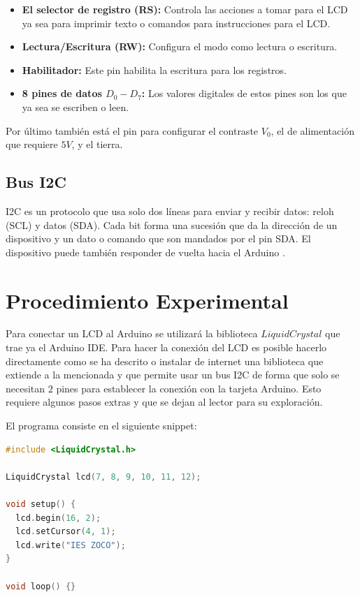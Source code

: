 \documentclass{article}
\begin{document}
    \begin{itemize}
        \item \textbf{El selector de registro (RS):} Controla las acciones a
        tomar para el LCD ya sea para imprimir texto o comandos para
        instrucciones para el LCD.
        \item \textbf{Lectura/Escritura (RW):} Configura el modo como lectura
        o escritura.
        \item \textbf{Habilitador:} Este pin habilita la escritura para los
        registros.
        \item \textbf{8 pines de datos $D_0-D_7$:} Los valores digitales de
        estos pines son los que ya sea se escriben o leen.
    \end{itemize}

    Por último también está el pin para configurar el contraste $V_0$, el de
    alimentación que requiere $5V$, y el tierra.

    \subsection{Bus I2C}

    I2C es un protocolo que usa solo dos líneas para enviar y recibir datos:
    reloh (SCL) y datos (SDA). Cada bit forma una sucesión que da la
    dirección de un dispositivo y un dato o comando que son mandados por el
    pin SDA. El dispositivo puede también responder de vuelta hacia el
    Arduino \cite{arduino-docs-i2c-2021}.

    \section{Procedimiento Experimental}

    Para conectar un LCD al Arduino se utilizará la biblioteca
    $LiquidCrystal$ que trae ya el Arduino IDE. Para hacer la conexión del
    LCD es posible hacerlo directamente como se ha descrito o instalar de
    internet una biblioteca que extiende a la mencionada y que permite usar
    un bus I2C de forma que solo se necesitan $2$ pines para establecer la
    conexión con la tarjeta Arduino. Esto requiere algunos pasos extras y que
    se dejan al lector para su exploración.

    \bigbreak

    El programa consiste en el siguiente snippet:

    \begin{lstlisting}[language=C, caption=Arduino Sketch]
#include <LiquidCrystal.h>

LiquidCrystal lcd(7, 8, 9, 10, 11, 12);

void setup() {
  lcd.begin(16, 2);
  lcd.setCursor(4, 1);
  lcd.write("IES ZOCO");
}

void loop() {}
    \end{lstlisting}
\end{document}
